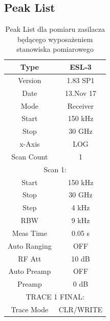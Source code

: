 \documentclass[12pt, a4paper, oneside]{article}
\begin{document}
\subsection{Peak List}
\begin{table}[h!]
  \centering
  \caption{Peak List dla pomiaru zasilacza będącego wyposażeniem stanowiska pomiarowego}
    \begin{tabular}{|c|c|c|c|}\hline
    \multicolumn{2}{|c|}{Type} & \multicolumn{2}{|c|}{ESL-3} \\\hline
    \multicolumn{2}{|c|}{Version} & \multicolumn{2}{|c|}{1.83 SP1} \\\hline
    \multicolumn{2}{|c|}{Date} & \multicolumn{2}{|c|}{13.Nov 17} \\\hline
    \multicolumn{2}{|c|}{Mode} & \multicolumn{2}{|c|}{Receiver} \\\hline
    \multicolumn{2}{|c|}{Start} & \multicolumn{2}{|c|}{150 kHz} \\\hline
    \multicolumn{2}{|c|}{Stop} & \multicolumn{2}{|c|}{30 GHz} \\\hline
    \multicolumn{2}{|c|}{x-Axis} & \multicolumn{2}{|c|}{LOG} \\\hline
    \multicolumn{2}{|c|}{Scan Count} & \multicolumn{2}{|c|}{1} \\\hline
    \multicolumn{4}{|c|}{Scan 1:} \\\hline
    \multicolumn{2}{|c|}{Start} & \multicolumn{2}{|c|}{150 kHz} \\\hline
    \multicolumn{2}{|c|}{Stop} & \multicolumn{2}{|c|}{30 GHz} \\\hline
    \multicolumn{2}{|c|}{Step} & \multicolumn{2}{|c|}{4 kHz} \\\hline
    \multicolumn{2}{|c|}{RBW} & \multicolumn{2}{|c|}{9 kHz} \\\hline
    \multicolumn{2}{|c|}{Meas Time} & \multicolumn{2}{|c|}{0.05 s} \\\hline
    \multicolumn{2}{|c|}{Auto Ranging} & \multicolumn{2}{|c|}{OFF} \\\hline
    \multicolumn{2}{|c|}{RF Att} & \multicolumn{2}{|c|}{10 dB} \\\hline
    \multicolumn{2}{|c|}{Auto Preamp} & \multicolumn{2}{|c|}{OFF} \\\hline
    \multicolumn{2}{|c|}{Preamp} & \multicolumn{2}{|c|}{0 dB} \\\hline
    \multicolumn{4}{|c|}{TRACE 1 FINAL:} \\\hline
    \multicolumn{2}{|c|}{Trace Mode} & \multicolumn{2}{|c|}{CLR/WRITE} \\\hline

\end{tabular}
\end{table}
\end{document}
